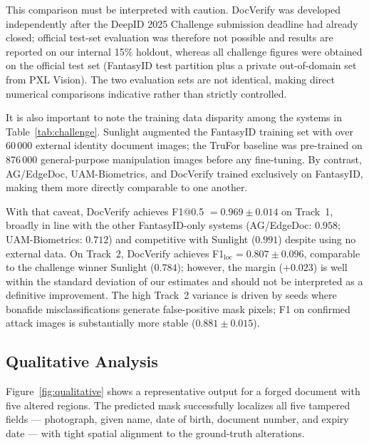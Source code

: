 This comparison must be interpreted with caution. DocVerify was developed
independently after the DeepID 2025 Challenge submission deadline had already
closed; official test-set evaluation was therefore not possible and results
are reported on our internal 15\% holdout, whereas all challenge figures
were obtained on the official test set (FantasyID test partition plus a
private out-of-domain set from PXL Vision). The two evaluation sets are
not identical, making direct numerical comparisons indicative rather than
strictly controlled.

It is also important to note the training data disparity among the systems
in Table~\ref{tab:challenge}. Sunlight augmented the FantasyID training set
with over 60\,000 external identity document images; the TruFor baseline
was pre-trained on 876\,000 general-purpose manipulation images before any
fine-tuning. By contrast, AG/EdgeDoc, UAM-Biometrics, and DocVerify trained
exclusively on FantasyID, making them more directly comparable to one another.

With that caveat, DocVerify achieves F1@0.5 $= 0.969 \pm 0.014$ on
Track~1, broadly in line with the other FantasyID-only systems
(AG/EdgeDoc: $0.958$; UAM-Biometrics: $0.712$) and competitive with
Sunlight ($0.991$) despite using no external data. On Track~2, DocVerify
achieves F1$_{\text{loc}} = 0.807 \pm 0.096$, comparable to the
challenge winner Sunlight ($0.784$); however, the margin ($+0.023$) is
well within the standard deviation of our estimates and should not be
interpreted as a definitive improvement. The high Track~2 variance is
driven by seeds where bonafide misclassifications generate false-positive
mask pixels; F1 on confirmed attack images is substantially more stable
($0.881 \pm 0.015$).

\subsection{Qualitative Analysis}
\label{subsec:qualitative}

Figure~\ref{fig:qualitative} shows a representative output for a forged
document with five altered regions. The predicted mask successfully localizes
all five tampered fields — photograph, given name, date of birth, document
number, and expiry date — with tight spatial alignment to the ground-truth
alterations.

